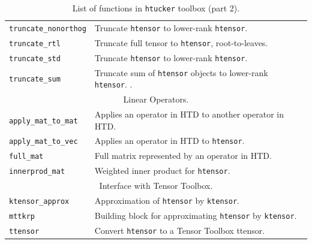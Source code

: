 \documentclass[11pt, a4paper]{article}
\newcommand{\htucker}{{\tt htucker}}
\begin{document}
\begin{preprint}
\begin{table}
\begin{tabular}{|p{3.2cm}|p{11cm}|}
\texttt{truncate\_nonorthog} & Truncate {\tt htensor} to lower-rank {\tt htensor}.\\
\texttt{truncate\_rtl}      & Truncate full tensor to {\tt htensor}, root-to-leaves.\\
\texttt{truncate\_std}       & Truncate {\tt htensor} to lower-rank {\tt htensor}.\\
\texttt{truncate\_sum}      & Truncate sum of {\tt htensor} objects to lower-rank {\tt htensor}.
.\\
\hline \hline
\multicolumn{2}{|c|}{Linear Operators.} \\
\hline
\texttt{apply\_mat\_to\_mat}& Applies an operator in HTD to another operator in HTD. \\
\texttt{apply\_mat\_to\_vec}& Applies an operator in HTD to {\tt htensor}.\\
\texttt{full\_mat}          & Full matrix represented by an operator in HTD.\\
\texttt{innerprod\_mat}     & Weighted inner product for {\tt htensor}.\\
\hline \hline
\multicolumn{2}{|c|}{Interface with Tensor Toolbox.} \\
\hline
\texttt{ktensor\_approx}    & Approximation of {\tt htensor} by {\tt ktensor}.\\
\texttt{mttkrp}             & Building block for approximating {\tt htensor} by {\tt ktensor}.\\
\texttt{ttensor}            & Convert {\tt htensor} to a Tensor Toolbox ttensor.\\
\hline
\end{tabular}
  \caption{List of functions in \htucker{} toolbox (part 2).} \label{tab:htucker_functions2}
\end{table}


\end{preprint}
\end{document}
